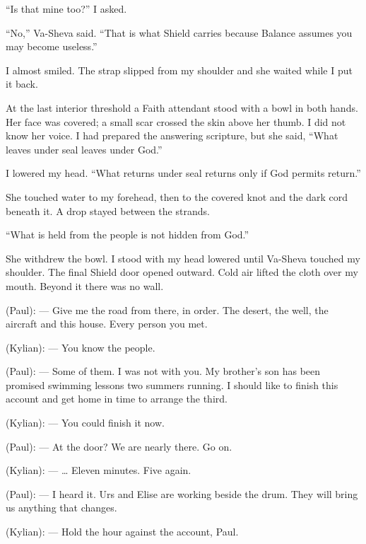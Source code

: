 ``Is that mine too?'' I asked.\par

``No,'' Va-Sheva said. ``That is what Shield carries because Balance assumes you may become useless.''\par

I almost smiled. The strap slipped from my shoulder and she waited while I put it back.\par

At the last interior threshold a Faith attendant stood with a bowl in both hands. Her face was covered; a small scar crossed the skin above her thumb. I did not know her voice. I had prepared the answering scripture, but she said, ``What leaves under seal leaves under God.''\par

I lowered my head. ``What returns under seal returns only if God permits return.''\par

She touched water to my forehead, then to the covered knot and the dark cord beneath it. A drop stayed between the strands.\par

``What is held from the people is not hidden from God.''\par

She withdrew the bowl. I stood with my head lowered until Va-Sheva touched my shoulder. The final Shield door opened outward. Cold air lifted the cloth over my mouth. Beyond it there was no wall.\par

\ornament

\begin{room}

(Paul): --- Give me the road from there, in order. The desert, the well, the aircraft and this house. Every person you met.

(Kylian): --- You know the people.

(Paul): --- Some of them. I was not with you. My brother's son has been promised swimming lessons two summers running. I should like to finish this account and get home in time to arrange the third.

(Kylian): --- You could finish it now.

(Paul): --- At the door? We are nearly there. Go on.

(Kylian): --- \ldots{} Eleven minutes. Five again.

(Paul): --- I heard it. Urs and Elise are working beside the drum. They will bring us anything that changes.

(Kylian): --- Hold the hour against the account, Paul.

\end{room}

